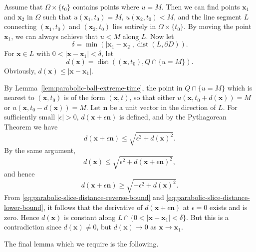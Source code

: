 \begin{Proof}
Assume that $\Omega\times\{t_0\}$ contains points where $u=M$. Then we can find points $\bm{x}_1$ and $\bm{x}_2$ in $\Omega$ such that $u(\bm{x}_1,t_0)=M$, $u(\bm{x}_2,t_0)<M$, and the line segment $L$ connecting $(\bm{x}_1,t_0)$ and $(\bm{x}_2,t_0)$ lies entirely in $\Omega\times\{t_0\}$. By moving the point $\bm{x}_1$, we can always achieve that $u<M$ along $L$. Now let
\begin{equation}\label{eq:parabolic-slice-distance-radius}
\delta=\min(|\bm{x}_1-\bm{x}_2|,\operatorname{dist}(L,\partial D)).
\end{equation}
For $\bm{x}\in L$ with $0<|\bm{x}-\bm{x}_1|<\delta$, let
\begin{equation}\label{eq:parabolic-slice-maximum-set-distance}
d(\bm{x})=\operatorname{dist}((\bm{x},t_0),Q\cap\{u=M\}).
\end{equation}
Obviously, $d(\bm{x})\leq|\bm{x}-\bm{x}_1|$.

By Lemma~\ref{lem:parabolic-ball-extreme-time}, the point in $Q\cap\{u=M\}$ which is nearest to $(\bm{x},t_0)$ is of the form $(\bm{x},t)$, so that either $u(\bm{x},t_0+d(\bm{x}))=M$ or $u(\bm{x},t_0-d(\bm{x}))=M$. Let $\bm{n}$ be a unit vector in the direction of $L$. For sufficiently small $|\epsilon|>0$, $d(\bm{x}+\epsilon\bm{n})$ is defined, and by the Pythagorean Theorem we have
\begin{equation}\label{eq:parabolic-slice-distance-forward-bound}
d(\bm{x}+\epsilon\bm{n})\leq\sqrt{\epsilon^2+d(\bm{x})^2}.
\end{equation}
By the same argument,
\begin{equation}\label{eq:parabolic-slice-distance-reverse-bound}
d(\bm{x})\leq\sqrt{\epsilon^2+d(\bm{x}+\epsilon\bm{n})^2},
\end{equation}
and hence
\begin{equation}\label{eq:parabolic-slice-distance-lower-bound}
d(\bm{x}+\epsilon\bm{n})\geq\sqrt{-\epsilon^2+d(\bm{x})^2}.
\end{equation}
From \eqref{eq:parabolic-slice-distance-reverse-bound} and \eqref{eq:parabolic-slice-distance-lower-bound}, it follows that the derivative of $d(\bm{x}+\epsilon\bm{n})$ at $\epsilon=0$ exists and is zero. Hence $d(\bm{x})$ is constant along $L\cap\{0<|\bm{x}-\bm{x}_1|<\delta\}$. But this is a contradiction since $d(\bm{x})\ne0$, but $d(\bm{x})\to0$ as $\bm{x}\to\bm{x}_1$.
\end{Proof}

The final lemma which we require is the following.

